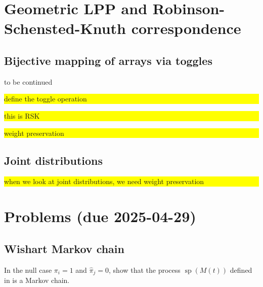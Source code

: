 \documentclass[letterpaper,11pt,oneside,reqno]{article}
\numberwithin{equation}{section}
\theoremstyle{definition}
\begin{document}
\section{Geometric LPP and Robinson-Schensted-Knuth correspondence}

\subsection{Bijective mapping of arrays via toggles}
\label{sub:toggle}

\colorbox{red!60!white}{\parbox{.7\textwidth}{to be continued}}

\colorbox{yellow}{\parbox{.7\textwidth}{define the toggle operation}}

\colorbox{yellow}{\parbox{.7\textwidth}{this is RSK}}

\colorbox{yellow}{\parbox{.7\textwidth}{weight preservation}}

\subsection{Joint distributions}
\label{sub:joint}

\colorbox{yellow}{\parbox{.7\textwidth}{when we look at joint distributions,
we need weight preservation}}


































\appendix
\setcounter{section}{12}

\section{Problems (due 2025-04-29)}

\subsection{Wishart Markov chain}
\label{prob:Markov}

In the null case $\pi_i = 1$ and $\hat\pi_j = 0$,
show that the
process $\operatorname{sp}(M(t))$
defined in 
is a Markov chain.
\end{document}
